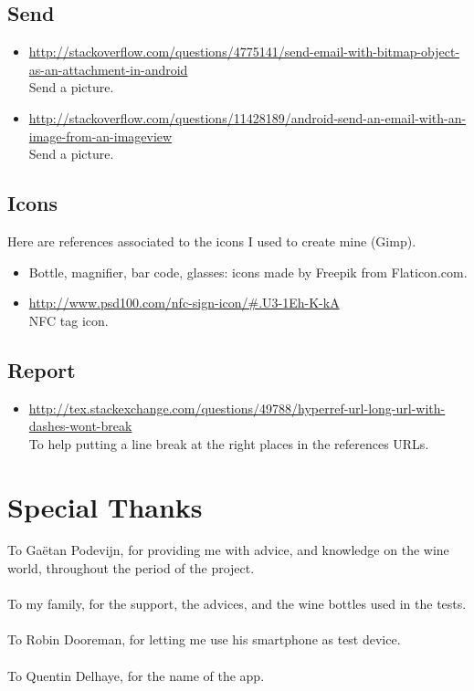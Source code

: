 \subsection{Send}

\begin{itemize}
	\item \url{http://stackoverflow.com/questions/4775141/send-email-with-bitmap-object-as-an-attachment-in-android} \\Send a picture.
	\item \url{http://stackoverflow.com/questions/11428189/android-send-an-email-with-an-image-from-an-imageview} \\Send a picture.
\end{itemize}

\subsection{Icons}

Here are references associated to the icons I used to create mine (Gimp).

\begin{itemize}
	\item Bottle, magnifier, bar code, glasses: icons made by Freepik from Flaticon.com.
	\item \url{http://www.psd100.com/nfc-sign-icon/#.U3-1Eh-K-kA} \\NFC tag icon.
\end{itemize}

\subsection{Report}

\begin{itemize}
	\item \url{http://tex.stackexchange.com/questions/49788/hyperref-url-long-url-with-dashes-wont-break} \\To help putting a line break at the right places in the references URLs.
\end{itemize}

\newpage
\section{Special Thanks}
\vfill
\begin{center}
To Gaëtan Podevijn, for providing me with advice, and knowledge on the wine world, throughout the period of the project.\\ ~\\

To my family, for the support, the advices, and the wine bottles used in the tests.\\ ~\\

To Robin Dooreman, for letting me use his smartphone as test device.\\ ~\\

To Quentin Delhaye, for the name of the app.
\end{center}

